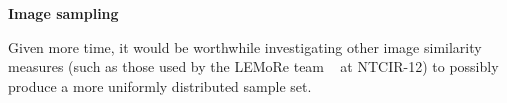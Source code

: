 \textbf{Image sampling}

Given more time, it would be worthwhile investigating other image similarity measures (such as those used by the LEMoRe team ~\cite{de40lemore} at NTCIR-12) to possibly produce a more uniformly distributed sample set.

 
 

